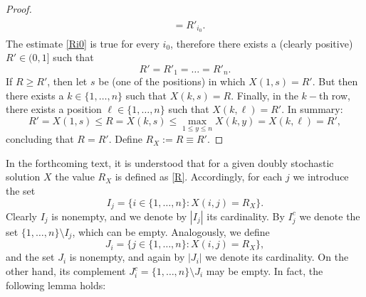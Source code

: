 \documentclass{article}
\theoremstyle{definition}\newtheorem{example}{Example}[section]
\begin{document}
\begin{proof}
\begin{eqnarray}
\begin{aligned}
				&=R'_{i_0}.
		\end{aligned}\end{eqnarray}
		The estimate \eqref{Ri0} is true for every $i_0$, therefore there exists a (clearly positive) $R'\in(0,1]$ such that
		\begin{equation}
			\label{Ris}
			R'=R'_1=\ldots=R'_n.
		\end{equation}
		If $R\geq R'$, then let $s$ be (one of the positions) in which $X(1,s)=R'$. But then there exists a $k\in\{1,\ldots, n\}$ such that
		$X(k,s)=R$. Finally, in the $k-$th row, there exists a position $\ell\in\{1,\ldots,n\}$ such that $X(k,\ell)=R'$. In summary: 
		$$R'=X(1,s)\leq R=X(k,s)\leq\max_{1\leq y\leq n}X(k,y)=X(k,\ell)=R',$$
		concluding that $R=R'$. Define $R_X:=R\equiv R'$. 
	\end{proof}
	In the forthcoming text, it is understood that for a given doubly stochastic solution $X$ the value $R_X$ is defined as \eqref{R}. Accordingly, for each $j$ we introduce the set 
	\begin{equation}
		\label{Ij}I_{j}=\{i\in\{1,\ldots,n\}: X(i,j)=R_X\}.
	\end{equation}
	Clearly $I_j$ is nonempty, and we denote by $|I_j|$ its cardinality. By $I^c_j$ we denote the set $\{1,\ldots,n\}\setminus I_j$, which can be empty. Analogously, we define
	\begin{equation}
		\label{Ji}J_{i}=\{j\in\{1,\ldots,n\}: X(i,j)=R_X\},
	\end{equation}
	and the set $J_i$ is nonempty, and again by $|J_i|$ we denote its cardinality. On the other hand,  its complement $J_i^c=\{1,\ldots,n\}\setminus J_i$ may be empty. In fact, the following lemma holds:
	
\end{document}
